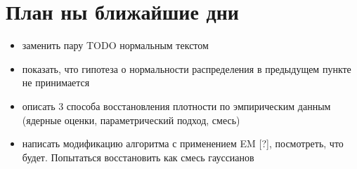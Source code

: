 \documentclass[12pt,a4paper]{report}
\begin{document}
\section{План ны ближайшие дни}
\begin{itemize}
\item заменить пару TODO нормальным текстом
\item показать, что гипотеза о нормальности распределения в предыдущем пункте не принимается
\item описать 3 способа восстановления плотности по эмпирическим данным (ядерные оценки, параметрический подход, смесь)
\item написать модификацию алгоритма с применением EM [?], посмотреть, что будет. Попытаться восстановить как смесь гауссианов
\end{itemize}
\end{document}
